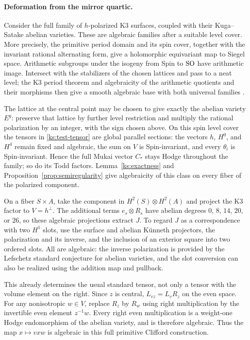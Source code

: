 \paragraph{Deformation from the mirror quartic.}
Consider the full family of $h$-polarized K3 surfaces, coupled
with their Kuga--Satake abelian varieties.  These are algebraic families
after a suitable level cover.  More precisely, the primitive
period domain and its spin cover, together with the invariant
rational alternating form, give a holomorphic equivariant
map to Siegel space.  Arithmetic subgroups under the
isogeny from Spin to $\operatorname{SO}$ have arithmetic image.  Intersect
with the stabilizers of the chosen lattices and pass to a
neat level; the K3 period theorem and algebraicity of the
arithmetic quotients and their morphisms then give a smooth
algebraic base with both universal families
\cite{DeligneK3,BailyBorel,BorelAlgebraicity}.

The lattice at the central point may be chosen to give
exactly the abelian variety $E^g$: preserve that lattice
by further level restriction and multiply the rational
polarization by an integer, with the sign chosen above.
On this spin level cover the tensors in
\eqref{ks:test-tensor} are global parallel sections:
the vectors $h$, $H^0$, and $H^4$ remain fixed and algebraic, the
sum on $V$ is Spin-invariant, and every $\theta_i$ is
Spin-invariant.  Hence the full Mukai vector $C_*$ stays
Hodge throughout the family; so do its Todd factors.
Lemma~\ref{ks:exactness} and
Proposition~\ref{prop:semiregularity} give algebraicity
of this class on every fiber of the polarized component.

On a fiber $S\times A$, take the component in $H^2(S)\otimes H^2(A)$
and project the K3 factor to
$V=h^\perp$.  The additional terms $e_s\otimes R_s$ have
abelian degrees $0$, $8$, $14$, $20$, or $26$, so these
algebraic projections extract $J$.  To regard $J$ as a correspondence
with two $H^1$ slots, use the surface and abelian
K\"unneth projectors, the polarization and its inverse,
and the inclusion of an exterior square into two ordered
slots.  All are algebraic: the inverse polarization is
provided by the Lefschetz standard conjecture for abelian
varieties, and the slot conversion can also be realized
using the addition map and pullback.

This already determines the usual standard tensor, not
only a tensor with the volume element on the right.
Since $z$ is central, $L_{vz}=L_vR_z$ on the even space.
For any nonisotropic $w\in V$, replace $R_z$ by $R_w$
using right multiplication by the invertible even
element $z^{-1}w$.  Every right even multiplication is
a weight-one Hodge endomorphism of the abelian variety,
and is therefore algebraic.  Thus the map
$x\mapsto vxw$ is algebraic in this full primitive
Clifford construction.

